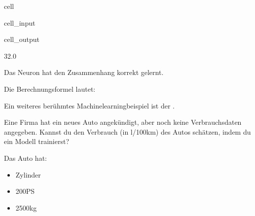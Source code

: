 \documentclass[letterpaper,10pt,english]{jupyterBook}
\begin{document}
\begin{sphinxuseclass}{cell}\begin{sphinxVerbatimInput}

\begin{sphinxuseclass}{cell_input}
\begin{sphinxVerbatim}[commandchars=\\\{\}]
\end{sphinxVerbatim}

\end{sphinxuseclass}\end{sphinxVerbatimInput}
\begin{sphinxVerbatimOutput}

\begin{sphinxuseclass}{cell_output}
\begin{sphinxVerbatim}[commandchars=\\\{\}]
[1.8]
32.0
\end{sphinxVerbatim}

\end{sphinxuseclass}\end{sphinxVerbatimOutput}

\end{sphinxuseclass}
\sphinxAtStartPar
Das Neuron hat den Zusammenhang korrekt gelernt.

\sphinxAtStartPar
Die Berechnungsformel lautet:

\sphinxAtStartPar
{}

\sphinxAtStartPar
Ein weiteres berühmtes Machinelearningbeispiel ist der .

\sphinxAtStartPar
{}

\sphinxAtStartPar
{}

\sphinxAtStartPar
Eine Firma hat ein neues Auto angekündigt, aber noch keine Verbrauchsdaten angegeben. Kannst du den Verbrauch (in l/100km) des Autos schätzen, indem du ein Modell trainierst?

\sphinxAtStartPar
Das Auto hat:
\begin{itemize}
\item {} 
 Zylinder

\item {} 
\sphinxAtStartPar
200PS

\item {} 
\sphinxAtStartPar
2500kg

\end{itemize}
\end{document}
